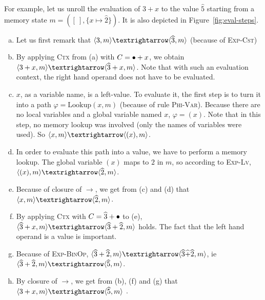 For example, let us unroll the evaluation of
$3+x$ to the value $\widehat{5}$
starting from a memory state $m = ([~], \{x ↦ \widehat{2}\}) $.
It is also depicted in Figure~\ref{fig:eval-steps}.

\begin{enumerate}[(a)]
\item %
  Let us first remark that $\mm{m}{3}{m}{\widehat{3}}$
  (because of \textsc{Exp-Cst})
\item %
  By applying \textsc{Ctx} from (a)
  with $C = \bullet{} + x$, we obtain
  $\mm{m}{3+x}{m}{\widehat{3}+x}$.
  Note that with such an evaluation context, the right hand operand does not
  have to be evaluated.
\item %
  $x$, as a variable name, is a left-value. To evaluate it, the first step is to
  turn it into a path $φ = \mathrm{Lookup}(x, m)$ (because of rule
  \textsc{Phi-Var}). Because there are no local variables and a global variable
  named $x$, $φ = (x)$. Note that in this step, no memory lookup was involved
  (only the names of variables were used). So $\mm{m}{x}{m}{(x)}$.
\item %
  In order to evaluate this path into a value, we have to perform a memory
  lookup. The global variable $(x)$ maps to $2$ in $m$, so according to
  \textsc{Exp-Lv}, $\mm{m}{(x)}{m}{\widehat{2}}$.
\item %
  Because of closure of $→$, we get from (c) and (d) that
  $\mm{m}{x}{m}{\widehat{2}}$.
\item %
  By applying \textsc{Ctx} with $C = \widehat{3} + \bullet{}$ to (e),
  $\mm{m}{\widehat{3} + x}{m}{\widehat{3} + \widehat{2}}$ holds.
  The fact that the left hand operand is a value is important.
\item %
  Because of \textsc{Exp-BinOp},
  $\mm{m}{
  \widehat{3} + \widehat{2}
  }{m}{
  \widehat{3} \widehat{+} \widehat{2}
  }$, ie
  $\mm{m}{
  \widehat{3} + \widehat{2}
  }{m}{
  \widehat{5}
  }$.
\item %
  By closure of $→$, we get from
  (b), (f) and (g) that
  $\mm{m}{3+x}{m}{\widehat{5}}$
  .
\end{enumerate}

